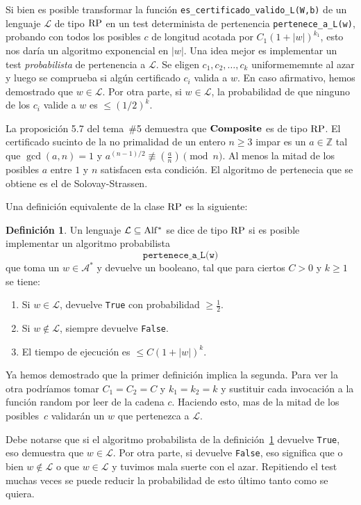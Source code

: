\documentclass[a4paper, 11pt]{article}
\newcommand{\Alf}{\mathcal{A}}
\newcommand{\Lan}{\mathcal{L}}
\newcommand{\ZZ}{\mathbb{Z}}
\theoremstyle{plain}
\theoremstyle{definition}
\newtheorem{defi}[teor]{Definición}
\begin{document}
Si bien es posible transformar la función \texttt{es\_certificado\_valido\_L(W,b)} de un
lenguaje $\Lan$ de tipo ${\rm RP}$ en un test determinista de pertenencia
\texttt{pertenece\_a\_L(w)}, probando con todos los posibles $c$ de longitud
acotada por $C_1(1+|w|)^{k_1}$, esto nos daría un algoritmo exponencial en $|w|$. Una
idea mejor es implementar un test \emph{probabilista} de pertenencia a $\Lan$. Se eligen
$c_1,c_2,\ldots,c_k$ uniformememnte al azar y luego se comprueba si algún certificado
$c_i$ valida a $w$. En caso afirmativo, hemos demostrado que $w\in\Lan$. Por otra parte,
si $w\in\Lan$, la probabilidad de que ninguno de los $c_i$ valide a $w$ es $\leq (1/2)^k$.

\bigskip

La proposición 5.7 del tema~\#5 demuestra que ${\bf Composite}$ es de tipo ${\rm RP}$. El
certificado sucinto de la no primalidad de un entero $n\geq 3$ impar es un $a\in\ZZ$
tal que $\gcd(a,n)=1$ y $a^{(n-1)/2}\not\equiv\left(\frac{a}{n}\right)\pmod{n}$. Al
menos la mitad de los posibles $a$ entre $1$ y $n$ satisfacen esta condición. El algoritmo
de pertenecia que se obtiene es el de Solovay-Strassen.

\bigskip

Una definición equivalente de la clase ${\rm RP}$ es la siguiente:

\begin{defi}\label{defRP-2}
Un lenguaje $\Lan\subseteq{\rm Alf^*}$ se dice de tipo ${\rm RP}$ si es posible implementar
un algoritmo probabilista
\[
   \texttt{pertenece\_a\_L(w)}
\]
que toma un $w\in\Alf^*$ y devuelve un booleano, tal que para ciertos $C>0$ y $k\geq 1$
se tiene:
\begin{enumerate}
\item Si $w\in\Lan$, devuelve \texttt{True} con probabilidad $\geq\frac{1}{2}$.
\item Si $w\not\in\Lan$, siempre devuelve \texttt{False}.
\item El tiempo de ejecución es $\leq C(1+|w|)^k$.
\end{enumerate}
\end{defi}

Ya hemos demostrado que la primer definición implica la segunda. Para ver la otra
podríamos tomar $C_1=C_2=C$ y $k_1=k_2=k$ y sustituir cada invocación a la función
random por leer de la cadena $c$. Haciendo esto, mas de la mitad de los posibles~$c$
validarán un $w$ que pertenezca a $\Lan$.

\bigskip

Debe notarse que si el algoritmo probabilista de la definición~\ref{defRP-2} devuelve
\texttt{True}, eso demuestra que $w\in\Lan$. Por otra parte, si devuelve \texttt{False},
eso significa que o bien $w\not\in\Lan$ o que $w\in\Lan$ y tuvimos mala suerte con el
azar. Repitiendo el test muchas veces se puede reducir la probabilidad de esto último
tanto como se quiera.
\end{document}
